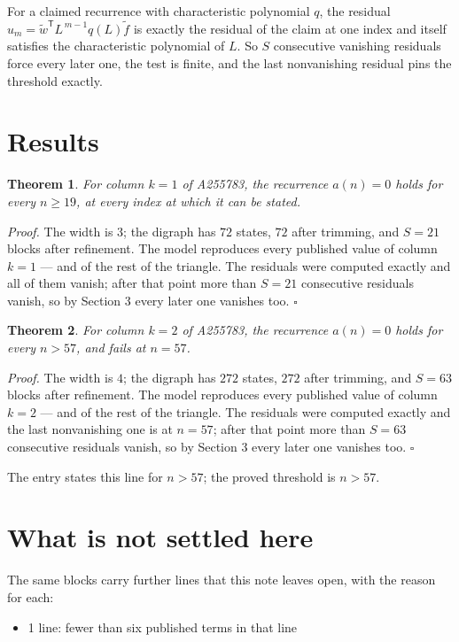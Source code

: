 \documentclass[11pt]{article}
\newtheorem{theorem}{Theorem}
\theoremstyle{definition}
\begin{document}
For a claimed recurrence with characteristic polynomial $q$, the residual $u_m = \tilde w^{\mathsf T}L^{\,m-1}q(L)\tilde f$ is exactly the residual of the claim at one index and itself satisfies the characteristic polynomial of $L$. So $S$ consecutive vanishing residuals force every later one, the test is finite, and the last nonvanishing residual pins the threshold exactly.

\section{Results}

\begin{theorem} For column $k = 1$ of A255783, the recurrence $a(n) = 0$ holds for every $n \ge 19$, at every index at which it can be stated.\end{theorem}

{\itshape Proof.} The width is $3$; the digraph has $72$ states, $72$ after trimming, and $S = 21$ blocks after refinement. The model reproduces every published value of column $k = 1$ --- and of the rest of the triangle. The residuals were computed exactly and all of them vanish; after that point more than $S = 21$ consecutive residuals vanish, so by Section 3 every later one vanishes too. $\square$

\begin{theorem} For column $k = 2$ of A255783, the recurrence $a(n) = 0$ holds for every $n > 57$, and fails at $n = 57$.\end{theorem}

{\itshape Proof.} The width is $4$; the digraph has $272$ states, $272$ after trimming, and $S = 63$ blocks after refinement. The model reproduces every published value of column $k = 2$ --- and of the rest of the triangle. The residuals were computed exactly and the last nonvanishing one is at $n = 57$; after that point more than $S = 63$ consecutive residuals vanish, so by Section 3 every later one vanishes too. $\square$

The entry states this line for $n > 57$; the proved threshold is $n > 57$.

\section{What is not settled here}

The same blocks carry further lines that this note leaves open, with the reason for each:

\begin{itemize}

\item 1 line: fewer than six published terms in that line

\end{itemize}
\end{document}
